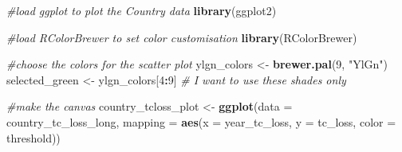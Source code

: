 \documentclass[
]{article}
\newenvironment{Shaded}{\begin{snugshade}}{\end{snugshade}}
\newcommand{\AttributeTok}[1]{\textcolor[rgb]{0.13,0.29,0.53}{#1}}
\newcommand{\CommentTok}[1]{\textcolor[rgb]{0.56,0.35,0.01}{\textit{#1}}}
\newcommand{\DecValTok}[1]{\textcolor[rgb]{0.00,0.00,0.81}{#1}}
\newcommand{\FunctionTok}[1]{\textcolor[rgb]{0.13,0.29,0.53}{\textbf{#1}}}
\newcommand{\NormalTok}[1]{#1}
\newcommand{\OtherTok}[1]{\textcolor[rgb]{0.56,0.35,0.01}{#1}}
\newcommand{\SpecialCharTok}[1]{\textcolor[rgb]{0.81,0.36,0.00}{\textbf{#1}}}
\newcommand{\StringTok}[1]{\textcolor[rgb]{0.31,0.60,0.02}{#1}}
\begin{document}
\begin{Shaded}
\begin{Highlighting}[]
\CommentTok{\#load ggplot to plot the Country data  }
\FunctionTok{library}\NormalTok{(ggplot2)}

\CommentTok{\#load RColorBrewer to set color customisation}
\FunctionTok{library}\NormalTok{(RColorBrewer)}

\CommentTok{\#choose the colors for the scatter plot}
\NormalTok{ylgn\_colors }\OtherTok{\textless{}{-}} \FunctionTok{brewer.pal}\NormalTok{(}\DecValTok{9}\NormalTok{, }\StringTok{"YlGn"}\NormalTok{)}
\NormalTok{selected\_green }\OtherTok{\textless{}{-}}\NormalTok{ ylgn\_colors[}\DecValTok{4}\SpecialCharTok{:}\DecValTok{9}\NormalTok{] }\CommentTok{\# I want to use these shades only}

\CommentTok{\#make the canvas}
\NormalTok{country\_tcloss\_plot }\OtherTok{\textless{}{-}} \FunctionTok{ggplot}\NormalTok{(}\AttributeTok{data =}\NormalTok{ country\_tc\_loss\_long, }\AttributeTok{mapping =} 
                                \FunctionTok{aes}\NormalTok{(}\AttributeTok{x =}\NormalTok{ year\_tc\_loss, }\AttributeTok{y =}\NormalTok{ tc\_loss, }
                                    \AttributeTok{color =}\NormalTok{ threshold))}


\end{Highlighting}
\end{Shaded}
\end{document}

